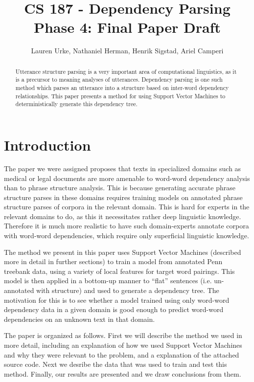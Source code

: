\documentclass[12pt,fleqn]{amsart}
\title{CS 187 - Dependency Parsing\\Phase 4: Final Paper Draft}
\author{Lauren Urke, Nathaniel Herman, Henrik Sigstad, Ariel Camperi}
\date{}
\begin{document}
    \begin{abstract}
    Utterance structure parsing is a very important area of computational linguistics, as it is a precursor to meaning analyses of utterances. Dependency parsing is one such method which parses an utterance into a structure based on inter-word dependency relationships. This paper presents a method for using Support Vector Machines to deterministically generate this dependency tree.
    \end{abstract}

    \maketitle

\section{Introduction}
The paper we were assigned proposes that texts in specialized domains such as medical or legal documents are more amenable to word-word dependency analysis than to phrase structure analysis. This is because generating accurate phrase structure parses in these domains requires training models on annotated phrase structure parses of corpora in the relevant domain. This is hard for experts in the relevant domains to do, as this it necessitates rather deep linguistic knowledge. Therefore it is much more realistic to have such domain-experts annotate corpora with word-word dependencies, which require only superficial linguistic knowledge.

The method we present in this paper uses Support Vector Machines (described more in detail in further sections) to train a model from annotated Penn treebank data, using a variety of local features for target word pairings. This model is then applied in a bottom-up manner to ``flat'' sentences (i.e. un-annotated with structure) and used to generate a dependency tree. The motivation for this is to see whether a model trained using only word-word dependency data in a given domain is good enough to predict word-word dependencies on an unknown text in that domain.

The paper is organized as follows. First we will describe the method we used in more detail, including an explanation of how we used Support Vector Machines and why they were relevant to the problem, and a explanation of the attached source code. Next we desribe the data that was used to train and test this method. Finally, our results are presented and we draw conclusions from them.
\end{document}

